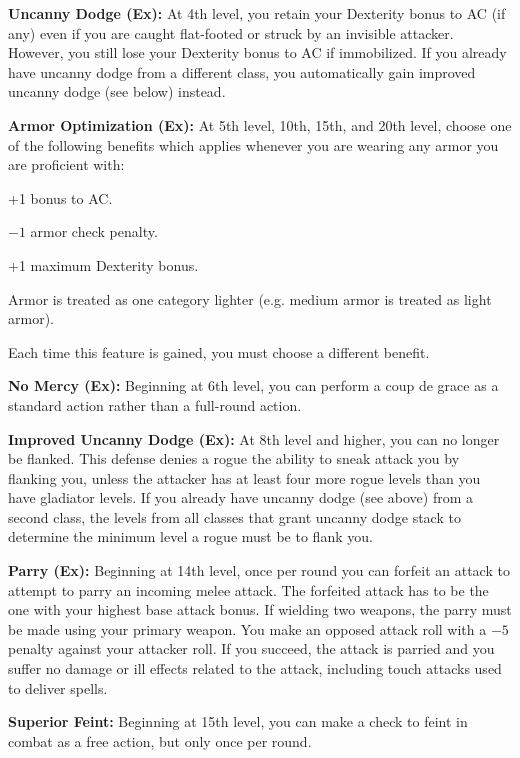 \textbf{Uncanny Dodge (Ex):} At 4th level, you retain your Dexterity bonus to AC (if any) even if you are caught flat-footed or struck by an invisible attacker. However, you still lose your Dexterity bonus to AC if immobilized. If you already have uncanny dodge from a different class, you automatically gain improved uncanny dodge (see below) instead.

\textbf{Armor Optimization (Ex):} At 5th level, 10th, 15th, and 20th level, choose one of the following benefits which applies whenever you are wearing any armor you are proficient with:

\begin{itemize*}
\item +1 bonus to AC.
\item $-1$ armor check penalty.
\item +1 maximum Dexterity bonus.
\item Armor is treated as one category lighter (e.g. medium armor is treated as light armor).
\end{itemize*}

Each time this feature is gained, you must choose a different benefit.

\textbf{No Mercy (Ex):} Beginning at 6th level, you can perform a coup de grace as a standard action rather than a full-round action.

\textbf{Improved Uncanny Dodge (Ex):} At 8th level and higher, you can no longer be flanked. This defense denies a rogue the ability to sneak attack you by flanking you, unless the attacker has at least four more rogue levels than you have gladiator levels. If you already have uncanny dodge (see above) from a second class, the levels from all classes that grant uncanny dodge stack to determine the minimum level a rogue must be to flank you.

\textbf{Parry (Ex):} Beginning at 14th level, once per round you can forfeit an attack to attempt to parry an incoming melee attack. The forfeited attack has to be the one with your highest base attack bonus. If wielding two weapons, the parry must be made using your primary weapon. You make an opposed attack roll with a $-5$ penalty against your attacker roll. If you succeed, the attack is parried and you suffer no damage or ill effects related to the attack, including touch attacks used to deliver spells.

\textbf{Superior Feint:} Beginning at 15th level, you can make a  check to feint in combat as a free action, but only once per round.

